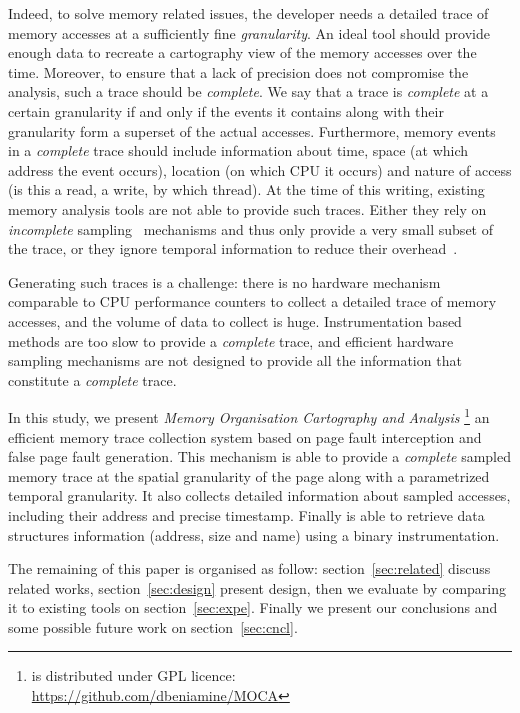 Indeed, to solve memory related issues, the developer needs a detailed trace of memory
accesses at a sufficiently fine \emph{granularity}.
An ideal tool should provide enough data to recreate a cartography view
of the memory accesses over the time.
Moreover, to ensure that a lack of precision
does not compromise the analysis, such a trace should be \emph{complete}. We say that a trace is
\emph{complete} at a certain granularity if and only if the events it contains along with their granularity
form a superset of the actual accesses. Furthermore, memory events in a \emph{complete} trace should
include information about time, space (at which address the event occurs),
location (on which CPU it occurs) and nature of access (is this
a read, a write, by which thread).
At the time of this writing, existing memory analysis tools are not able to provide such traces.
Either they rely on \emph{incomplete} sampling~\cite{Liu14Tool,Lachaize12MemProf}
mechanisms and thus only provide a very small subset of the trace, or they
ignore temporal information to reduce their
overhead~\cite{Beniamine15TABARNACRR}.

Generating such traces is a challenge: there is no hardware mechanism
comparable to CPU performance counters to collect a detailed trace of memory accesses, and the volume
of data to collect is huge. Instrumentation based methods are too slow
to provide a \emph{complete} trace, and efficient hardware sampling mechanisms are not designed
to provide all the information that constitute a \emph{complete} trace.

In this study, we present \emph{Memory Organisation Cartography and Analysis}
\footnote{\Moca is distributed under GPL licence:\\
    \url{https://github.com/dbeniamine/MOCA}}
an efficient memory trace collection system based on page fault interception
and false page fault generation.
This mechanism is able to provide a \emph{complete} sampled memory trace at
the spatial granularity of the page along with a parametrized temporal granularity.
It also collects detailed information about sampled accesses, including their address and
precise timestamp. Finally \Moca is able to retrieve data structures
information (address, size and name) using a binary instrumentation.

The remaining of this paper is organised as follow: section~\ref{sec:related}
discuss related works, section~\ref{sec:design} present \Moca design, then we
evaluate \Moca by comparing it to existing tools on section~\ref{sec:expe}.
Finally we present our conclusions and some possible future work on
section~\ref{sec:cncl}.

